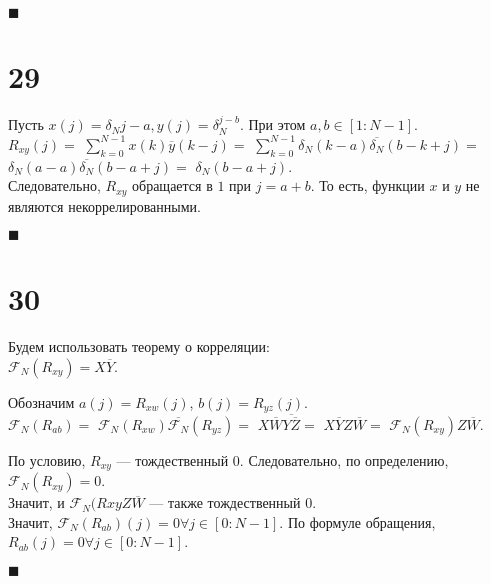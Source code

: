 \documentclass{article}
\newcommand\proofend{\begin{flushright}$\blacksquare$\end{flushright}}
\begin{document}
{\proofend

\section*{29}

Пусть $x(j) = \delta_N{j - a}, y(j) = \delta_N^{j - b}$. При этом $a, b \in [1 : N - 1]$.\\

$R_{xy}(j) = $
$\sum\limits_{k = 0}^{N - 1} x(k) \overline{y} (k - j) =$
$\sum\limits_{k = 0}^{N - 1} \delta_N(k - a) \overline{\delta_N} (b - k + j) =$
$\delta_N(a - a) \overline{\delta_N} (b - a + j) = $
$\delta_N (b - a + j).$\\
Следовательно, $R_{xy}$ обращается в $1$ при $j = a + b$. То есть, функции $x$ и $y$ не являются некоррелированными.

\proofend

\section*{30}
Будем использовать теорему о корреляции:\\
$\mathcal{F}_N(R_{xy}) = X\overline{Y}$.

Обозначим $a(j) = R_{xw}(j)$, $b(j) = R_{yz}(j)$.\\
$\mathcal{F}_N(R_{ab}) =$
$\mathcal{F}_N(R_{xw}) \overline{\mathcal{F}_N}(R_{yz}) =$
$X\overline{W} \overline{Y\overline{Z}} = $
$X\overline{Y} Z \overline{W} = $
$\mathcal{F}_N(R_{xy}) Z\overline{W}.$

По условию, $R_{xy}$ --- тождественный $0$. Следовательно, по определению, $\mathcal{F}_N(R_{xy}) = 0$.\\
Значит, и $\mathcal{F}_N(R{xy} Z \overline{W}$ --- также тождественный $0$.\\
Значит, $\mathcal{F}_N(R_{ab})(j) = 0 \forall j \in [0 : N - 1]$. По формуле обращения, $R_{ab}(j) = 0 \forall j \in [0 : N - 1]$.
\proofend
}
\end{document}
